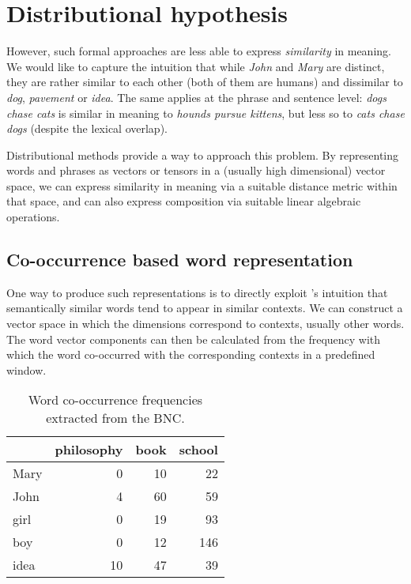 \section{Distributional hypothesis}
\label{sec:distr-hypoth}

However, such formal approaches are less able to express
\emph{similarity} in meaning. We would like to capture the intuition
that while \textit{John} and \textit{Mary} are distinct, they are
rather similar to each other (both of them are humans) and dissimilar
to \textit{dog}, \textit{pavement} or \textit{idea}. The same applies
at the phrase and sentence level: \textit{dogs chase cats} is similar
in meaning to \textit{hounds pursue kittens}, but less so to
\textit{cats chase dogs} (despite the lexical overlap).

Distributional methods provide a way to approach this problem. By
representing words and phrases as vectors or tensors in a (usually
high dimensional) vector space, we can express similarity in meaning
via a suitable distance metric within that space, and can also express
composition via suitable linear algebraic operations.

\subsection{Co-occurrence based word representation}
\label{sec:distr-repr}

One way to produce such representations is to directly exploit
's intuition that semantically
similar words tend to appear in similar contexts. We can construct a
vector space in which the dimensions correspond to contexts, usually
other words. The word vector components can then be calculated from
the frequency with which the word co-occurred with the corresponding
contexts in a predefined window.

\begin{table}[ht]
  \centering
  \begin{tabular}{lrrr}
    \toprule
    & philosophy & book & school \\
    \midrule
    Mary & 0  & 10 & 22  \\
    John & 4  & 60 & 59  \\
    girl & 0  & 19 & 93  \\
    boy  & 0  & 12 & 146 \\
    idea & 10 & 47 & 39  \\
    \bottomrule
  \end{tabular}
  \caption{Word co-occurrence frequencies extracted from the BNC.}
  \label{tab:comparison}
\end{table}

